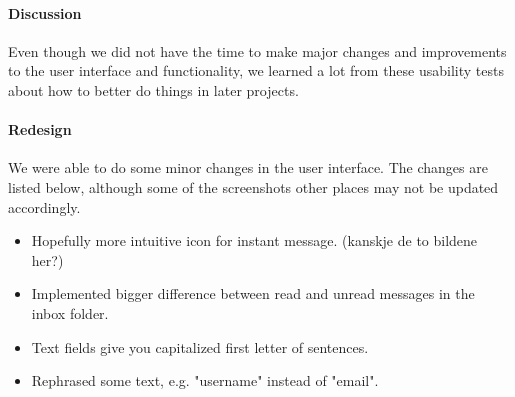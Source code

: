 		\paragraph{Discussion}\hfill
\newline
Even though we did not have the time to make major changes and improvements to the user interface and functionality, we learned a lot from these usability tests about how to better do things in later projects.
		\paragraph{Redesign}\hfill
\newline
		We were able to do some minor changes in the user interface. The changes are listed below, although some of the screenshots other places may not be updated accordingly.
		\begin{itemize}
			\item{}Hopefully more intuitive icon for instant message. (kanskje de to bildene her?)
			\item{}Implemented bigger difference between read and unread messages in the inbox folder.
			\item{}Text fields give you capitalized first letter of sentences.
			\item{}Rephrased some text, e.g. "username" instead of "email".
		\end{itemize}